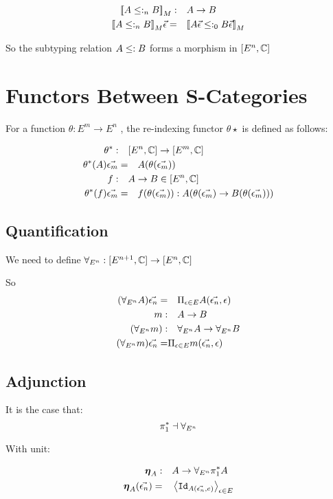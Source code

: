 \documentclass{report}
\newcommand\ev[0]{\vec{\e}}
\newcommand\emv[0]{\vec{\e_m}}
\newcommand\env[0]{\vec{\e_n}}
\newcommand\allEn[0]{\forall_{E^n}}
\newcommand\unit[1]{\boldsymbol{\eta}_{#1}}
\begin{document}
\begin{align}
    \deno{A\subtype_n B}:&\quad A\rightarrow B\\
    \deno{A\subtype_n B}\ev=&\quad \deno{A\ev\subtype_0 B\ev}
\end{align}

So the subtyping relation $A \leq: B$ forms a morphism in $[E^n, \mathbb{C}]$

\section{Functors Between S-Categories}
For a function $\theta: E^m \rightarrow E^n$ , the re-indexing functor $\theta\star$ is defined as follows:

\begin{align}
    \theta\star:\quad& [E^n, \C] \rightarrow [E^m, \C]\\
    \theta\star(A)\emv=&\quad A(\theta (\emv))\\
    f:\quad& A \rightarrow B \in[E^n, \C]\\
    \theta\star(f)\emv =&\quad f(\theta(\emv)): A(\theta(\emv)\rightarrow B(\theta(\emv)))
\end{align}

\subsection{Quantification}
We need to define $\allEn: [E^{n+1}, \C]\rightarrow[E^n, \C]$

So
\begin{align}
    (\allEn A)\env =&\quad \Pi_{\e\in E} A(\env, \e)\\
    m:&\quad A\rightarrow B\\
    (\allEn m):&\quad \allEn A\rightarrow \allEn B\\
    (\allEn m)\env =&\Pi_{\e\in E} m(\env, \e)\\
\end{align}

\subsection{Adjunction}
It is the case that:
$$\pstar \dashv \allEn$$

With unit:

\begin{align}
    \unit{A}:&\quad A \rightarrow \allEn\pstar A\\
    \unit{A}(\env)=&\quad\finpr{\Id{A(\env,e)}}{\e\in E}
\end{align}
\end{document}

